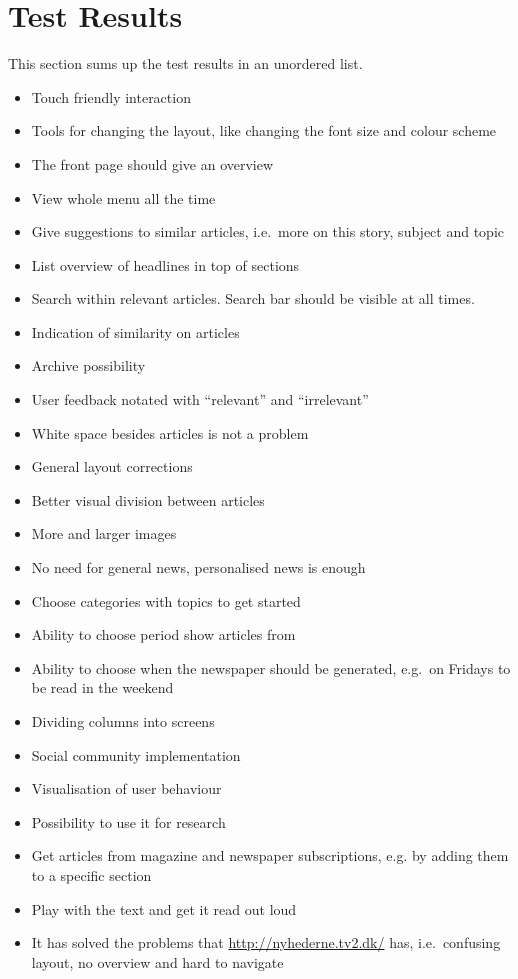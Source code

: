 \section{Test Results}
\label{sec:test_results}
This section sums up the test results in an unordered list.
\begin{itemize}
 \item Touch friendly interaction
 \item Tools for changing the layout, like changing the font size and colour scheme
 \item The front page should give an overview
 \item View whole menu all the time
 \item Give suggestions to similar articles, i.e.\ more on this story, subject and topic
 \item List overview of headlines in top of sections
 \item Search within relevant articles. Search bar should be visible at all times.
 \item Indication of similarity on articles
 \item Archive possibility
 \item User feedback notated with ``relevant'' and ``irrelevant''
 \item White space besides articles is not a problem
 \item General layout corrections
 \item Better visual division between articles
 \item More and larger images
 \item No need for general news, personalised news is enough
 \item Choose categories with topics to get started
 \item Ability to choose period show articles from
 \item Ability to choose when the newspaper should be generated, e.g.\ on Fridays to be read in the weekend
 \item Dividing columns into screens
 \item Social community implementation
 \item Visualisation of user behaviour
 \item Possibility to use it for research
 \item Get articles from magazine and newspaper subscriptions, e.g. by adding them to a specific section
 \item Play with the text and get it read out loud
 \item It has solved the problems that \url{http://nyhederne.tv2.dk/} has, i.e.\ confusing layout, no overview and hard to navigate
\end{itemize}
